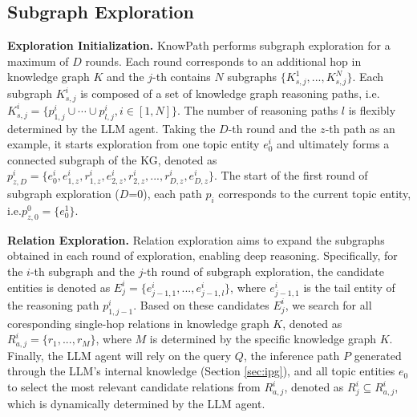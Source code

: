 \subsection{Subgraph Exploration}

\textbf{Exploration Initialization.} 
KnowPath performs subgraph exploration for a maximum of $D$ rounds.
Each round corresponds to an additional hop in knowledge graph $K$ and the $j$-th contains $N$ subgraphs $\{K_{s,j}^1,...,K_{s,j}^N \}$.
Each subgraph $K_{s,j}^i$ is composed of a set of knowledge graph reasoning paths, i.e. $K_{s,j}^i=\{p_{1,j}^i\cup \cdots \cup p_{l,j}^i,i \in [1,N]\}$.
The number of reasoning paths $l$ is flexibly determined by the LLM agent.
Taking the $D$-th round and the $z$-th path as an example, it starts exploration from one topic entity $e_{0}^i$ and ultimately forms a connected subgraph of the KG, denoted as ${p_{z,D}^i=\{e_{0}^i, e_{1,z}^i,r_{1,z}^i, e_{2,z}^i, r_{2,z}^i, ..., r_{D,z}^i, e_{D,z}^i\}}$.
The start of the first round of subgraph exploration ($D$=0), each path $p_i$ corresponds to the current topic entity, i.e.${p_{z,0}^0=\{e_{0}^1\}}$.




\textbf{Relation Exploration.}
Relation exploration aims to expand the subgraphs obtained in each round of exploration, enabling deep reasoning. Specifically, for the $i$-th subgraph and the $j$-th round of subgraph exploration, the candidate entities is denoted as $E_{j}^{i}=\{e_{j-1,1}^i,...,e_{j-1,l}^i\}$, where $e_{j-1,1}^i$ is the tail entity of the reasoning path $p_{1,j-1}^i$.
Based on these candidates $E_{j}^{i}$, we search for all coresponding single-hop relations in knowledge graph $K$, denoted as $R_{a,j}^{i}=\{r_1,...,r_M\}$, where $M$ is determined by the specific knowledge graph $K$.
Finally, the LLM agent will rely on the query $Q$, the inference path $P$ generated through the LLM’s internal knowledge (Section \ref{sec:ipg}), and all topic entities $e_{0}$ to select the most relevant candidate relations from $R_{a,j}^{i}$, denoted as $R_{j}^{i} \subseteq R_{a,j}^{i} $, which is dynamically determined by the LLM agent.



